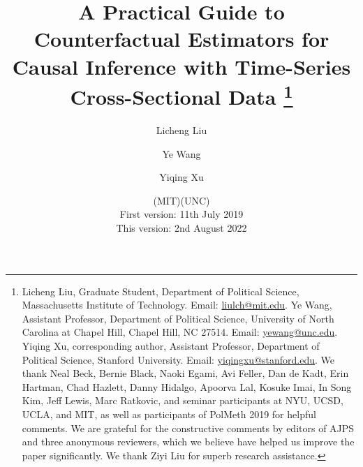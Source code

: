 \documentclass[12pt]{article}
\begin{document}
\onehalfspacing

\title{\Large\bf A Practical Guide to Counterfactual Estimators for Causal Inference with Time-Series Cross-Sectional Data%
\thanks{Licheng Liu, Graduate Student, Department of Political Science, Massachusetts Institute of Technology. Email: \url{liulch@mit.edu}. Ye Wang, Assistant Professor, Department of Political Science, University of North Carolina at Chapel Hill, Chapel Hill, NC 27514. Email: \url{yewang@unc.edu}. Yiqing Xu, corresponding author, Assistant Professor, Department of Political Science, Stanford University. Email: \url{yiqingxu@stanford.edu}. We thank Neal Beck, Bernie Black,  Naoki Egami, Avi Feller, Dan de Kadt, Erin Hartman, Chad Hazlett, Danny Hidalgo, Apoorva Lal, Kosuke Imai, In Song Kim, Jeff Lewis, Marc Ratkovic, and seminar participants at NYU, UCSD, UCLA, and MIT, as well as participants of PolMeth 2019 for helpful comments. We are grateful for the constructive comments by editors of AJPS and three anonymous reviewers, which we believe have helped us improve the paper significantly. We thank Ziyi Liu for superb research assistance.}}

\author{Licheng Liu\and Ye Wang\and Yiqing Xu}

\date{
  \vspace{-0.5em}\hspace{1.2em}(MIT)\hspace{4.8em}(UNC)\hspace{3.5em}{(Stanford)} \\\vspace{1em}
  First version: 11th July 2019\\
  This version: 2nd August 2022\vspace{2em} 
}

\maketitle
\end{document}
